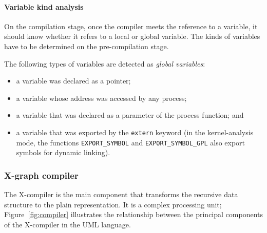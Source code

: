 

\paragraph{Variable kind analysis}
\label{ch:impl:proc:x-pre-compiler:var}

On the compilation stage, once the compiler meets the reference to a variable, it should know whether it refers to a local or global variable.
The kinds of variables have to be determined on the pre-compilation stage.

The following types of variables are detected as \textit{global variables}:
\begin{itemize}
\item a variable was declared as a pointer;
\item a variable whose address was accessed by any process;
\item a variable that was declared as a parameter of the process function; and
\item a variable that was exported by the \texttt{extern} keyword (in the kernel-analysis mode, the functions \texttt{EXPORT\_SYMBOL} and \texttt{EXPORT\_SYMBOL\_GPL} also export symbols for dynamic linking). %
\end{itemize}


\subsubsection{X-graph compiler}
\label{ch:impl:proc:x-compiler}

The X-compiler is the main component that transforms the recursive \ytree{} data structure to the plain \xgraph{} representation.
It is a complex processing unit; Figure~\ref{fig:compiler} illustrates the relationship between the principal components of the X-compiler in the UML language.

